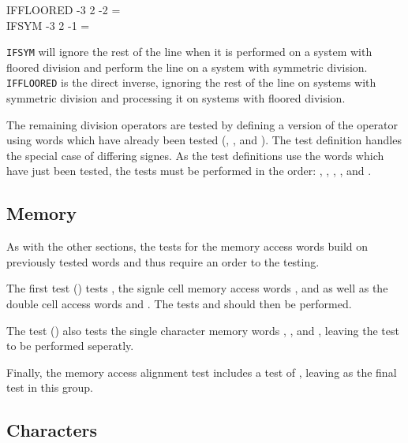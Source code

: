 \begin{tt}
\word{:} IFFLOORED 
	\word{[} -3 2 \word{/} -2 =  \word{]}
	    
\word{;} \\
\word{:} IFSYM \tab[1.8]
	\word{[} -3 2 \word{/} -1 =  \word{]}
	    
\word{;}
\end{tt}

\texttt{IFSYM} will ignore the rest of the line when it is performed
on a system with floored division and perform the line on a system
with symmetric division.  \texttt{IFFLOORED} is the direct inverse,
ignoring the rest of the line on systems with symmetric division and
processing it on systems with floored division.

The remaining division operators are tested by defining a version of
the operator using words which have already been tested (,
,  and ).  The test definition
handles the special case of differing signes.  As the test definitions
use the words which have just been tested, the tests must be performed
in the order:
	,
	,
	,
	, and
	.

\subsection{Memory}

As with the other sections, the tests for the memory access words
build on previously tested words and thus require an order to the
testing.

The first test () tests , the signle cell
memory access words , \word{!} and  as well as
the double cell access words  and .  The tests
 and  should then be
performed.

The test () also tests the single character memory
words , , and , leaving the test
 to be performed seperatly.

Finally, the memory access alignment test 
includes a test of , leaving 
as the final test in this group.

\subsection{Characters}

